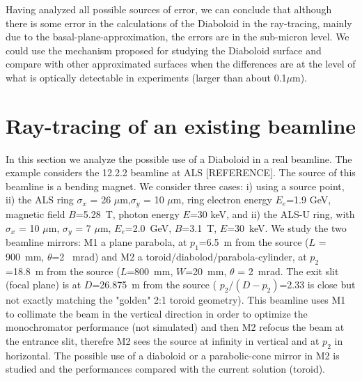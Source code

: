 \documentclass[a4paper, 11pt]{article}
\begin{document}
Having analyzed all possible sources of error, we can conclude that although there is some error in the calculations of the Diaboloid in the ray-tracing, mainly due to the basal-plane-approximation, the errors are in the sub-micron level. We could use the mechanism proposed for studying the Diaboloid surface and compare with other approximated surfaces when the differences are at the level of what is optically detectable in experiments (larger than about 0.1$\mu$m).

\section{Ray-tracing of an existing beamline}

In this section we analyze the possible use of a Diaboloid in a real beamline. The example considers the 12.2.2 beamline at ALS [REFERENCE]. The source of this beamline is a bending magnet. We consider three cases: i) using a source point, ii) the ALS ring
$\sigma_x$ = 26 $\mu$m,$\sigma_y$ = 10 $\mu$m, ring electron energy $E_e$=1.9 GeV, magnetic field $B$=5.28~T, photon energy $E$=30 keV, and ii) the ALS-U ring, with $\sigma_x$ = 10 $\mu$m, $\sigma_y$ = 7 $\mu$m, $E_e$=2.0~GeV, $B$=3.1~T, $E$=30~keV. We study the two beamline mirrors: M1 a plane parabola, at $p_1$=6.5~m from the source ($L$ = 900~mm, $\theta$=2 ~mrad) and M2 a toroid/diabolod/parabola-cylinder, at $p_2$=18.8~m from the source ($L$=800~mm, $W$=20~mm, $\theta$ = 2~mrad. The exit slit (focal plane) is at $D$=26.875~m from the source  ( $p_2/(D-p_2)$=2.33 is close but not exactly matching the "golden" 2:1 toroid geometry). This beamline uses M1 to collimate the beam in the vertical direction in order to optimize the monochromator performance (not simulated) and then M2 refocus the beam at the entrance slit, therefre M2 sees the source at infinity in vertical and at $p_2$ in horizontal. The possible use of a diaboloid or a parabolic-cone mirror in M2 is studied and the performances compared with the current solution (toroid).
\end{document}
